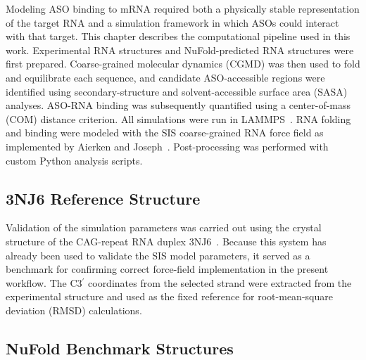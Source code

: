 
Modeling ASO binding to mRNA required both a physically stable representation
of the target RNA and a simulation framework in which ASOs could interact
with that target. This chapter describes the computational pipeline used in
this work. Experimental RNA structures and NuFold-predicted RNA structures
were first prepared. Coarse-grained molecular dynamics (CGMD) was then used
to fold and equilibrate each sequence, and candidate ASO-accessible regions
were identified using secondary-structure and solvent-accessible surface area
(SASA) analyses. ASO-RNA binding was subsequently quantified using a
center-of-mass (COM) distance criterion. All simulations were run in
LAMMPS~\cite{Thompson2022}. RNA folding and binding were modeled with the
SIS coarse-grained RNA force field as implemented by Aierken and
Joseph~\cite{Aierken2024}. Post-processing was performed with custom Python
analysis scripts.


\subsection{3NJ6 Reference Structure}
\label{sec:3nj6}

Validation of the simulation parameters was carried out using the crystal
structure of the CAG-repeat RNA duplex 3NJ6~\cite{Aierken2024}. Because this
system has already been used to validate the SIS model parameters, it served
as a benchmark for confirming correct force-field implementation in the
present workflow. The C3$^\prime$ coordinates from the selected strand were
extracted from the experimental structure and used as the fixed reference for
root-mean-square deviation (RMSD) calculations.


\subsection{NuFold Benchmark Structures}
\label{sec:nufold}

